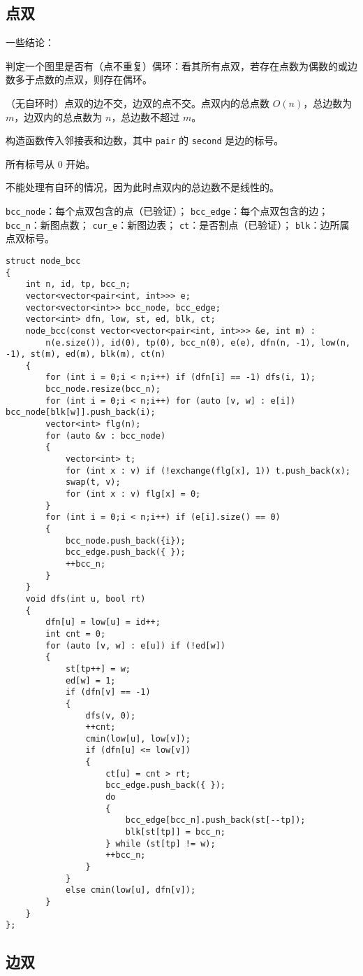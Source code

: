 \documentclass[12pt]{ctexart}
\begin{document}
\subsection{点双}

一些结论：

判定一个图里是否有（点不重复）偶环：看其所有点双，若存在点数为偶数的或边数多于点数的点双，则存在偶环。

（无自环时）点双的边不交，边双的点不交。点双内的总点数 $O(n)$，总边数为 $m$，边双内的总点数为 $n$，总边数不超过 $m$。

构造函数传入邻接表和边数，其中 \verb|pair| 的 \verb|second| 是边的标号。

所有标号从 $0$ 开始。

不能处理有自环的情况，因为此时点双内的总边数不是线性的。

\verb|bcc_node|：每个点双包含的点（已验证）；
\verb|bcc_edge|：每个点双包含的边；
\verb|bcc_n|：新图点数；
\verb|cur_e|：新图边表；
\verb|ct|：是否割点（已验证）；
\verb|blk|：边所属点双标号。

\begin{lstlisting}
struct node_bcc
{
	int n, id, tp, bcc_n;
	vector<vector<pair<int, int>>> e;
	vector<vector<int>> bcc_node, bcc_edge;
	vector<int> dfn, low, st, ed, blk, ct;
	node_bcc(const vector<vector<pair<int, int>>> &e, int m) :
		n(e.size()), id(0), tp(0), bcc_n(0), e(e), dfn(n, -1), low(n, -1), st(m), ed(m), blk(m), ct(n)
	{
		for (int i = 0;i < n;i++) if (dfn[i] == -1) dfs(i, 1);
		bcc_node.resize(bcc_n);
		for (int i = 0;i < n;i++) for (auto [v, w] : e[i]) bcc_node[blk[w]].push_back(i);
		vector<int> flg(n);
		for (auto &v : bcc_node)
		{
			vector<int> t;
			for (int x : v) if (!exchange(flg[x], 1)) t.push_back(x);
			swap(t, v);
			for (int x : v) flg[x] = 0;
		}
		for (int i = 0;i < n;i++) if (e[i].size() == 0)
		{
			bcc_node.push_back({i});
			bcc_edge.push_back({ });
			++bcc_n;
		}
	}
	void dfs(int u, bool rt)
	{
		dfn[u] = low[u] = id++;
		int cnt = 0;
		for (auto [v, w] : e[u]) if (!ed[w])
		{
			st[tp++] = w;
			ed[w] = 1;
			if (dfn[v] == -1)
			{
				dfs(v, 0);
				++cnt;
				cmin(low[u], low[v]);
				if (dfn[u] <= low[v])
				{
					ct[u] = cnt > rt;
					bcc_edge.push_back({ });
					do
					{
						bcc_edge[bcc_n].push_back(st[--tp]);
						blk[st[tp]] = bcc_n;
					} while (st[tp] != w);
					++bcc_n;
				}
			}
			else cmin(low[u], dfn[v]);
		}
	}
};
\end{lstlisting}

\subsection{边双}
\end{document}
